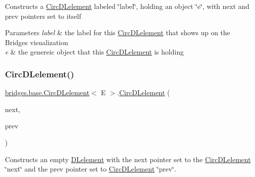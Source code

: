 Constructs a \mbox{\hyperlink{classbridges_1_1base_1_1_circ_d_lelement}{Circ\+D\+Lelement}} labeled \char`\"{}label\char`\"{}, holding an object \char`\"{}e\char`\"{}, with next and prev pointers set to itself


\begin{DoxyParams}{Parameters}
{\em label} & the label for this \mbox{\hyperlink{classbridges_1_1base_1_1_circ_d_lelement}{Circ\+D\+Lelement}} that shows up on the Bridges visualization \\
\hline
{\em e} & the genereic object that this \mbox{\hyperlink{classbridges_1_1base_1_1_circ_d_lelement}{Circ\+D\+Lelement}} is holding \\
\hline
\end{DoxyParams}
\mbox{\label{classbridges_1_1base_1_1_circ_d_lelement_a98a471fc3225ed80595e1ffdb377e336}} 
\subsubsection{\texorpdfstring{Circ\+D\+Lelement()}{CircDLelement()}\hspace{0.1cm}{\footnotesize\ttfamily [3/4]}}
{\footnotesize\ttfamily \mbox{\hyperlink{classbridges_1_1base_1_1_circ_d_lelement}{bridges.\+base.\+Circ\+D\+Lelement}}$<$ E $>$.\mbox{\hyperlink{classbridges_1_1base_1_1_circ_d_lelement}{Circ\+D\+Lelement}} (\begin{DoxyParamCaption}\item[{\mbox{\hyperlink{classbridges_1_1base_1_1_circ_d_lelement}{Circ\+D\+Lelement}}$<$ E $>$}]{next,  }\item[{\mbox{\hyperlink{classbridges_1_1base_1_1_circ_d_lelement}{Circ\+D\+Lelement}}$<$ E $>$}]{prev }\end{DoxyParamCaption})}

Constructs an empty \mbox{\hyperlink{classbridges_1_1base_1_1_d_lelement}{D\+Lelement}} with the next pointer set to the \mbox{\hyperlink{classbridges_1_1base_1_1_circ_d_lelement}{Circ\+D\+Lelement}} \char`\"{}next\char`\"{} and the prev pointer set to \mbox{\hyperlink{classbridges_1_1base_1_1_circ_d_lelement}{Circ\+D\+Lelement}} \char`\"{}prev\char`\"{}.


